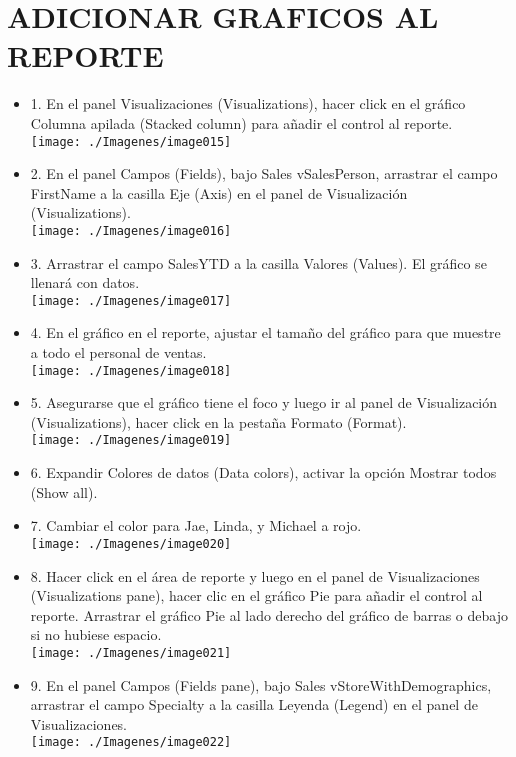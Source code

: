 \section{ADICIONAR GRAFICOS AL REPORTE} 

\begin{itemize}

\item 1. En el panel Visualizaciones (Visualizations), hacer click en el gráfico Columna apilada (Stacked column) para
añadir el control al reporte. \\
\texttt{[image: ./Imagenes/image015]}
\item 2. En el panel Campos (Fields), bajo Sales vSalesPerson, arrastrar el campo FirstName a la casilla Eje (Axis) en el
panel de Visualización (Visualizations). \\
\texttt{[image: ./Imagenes/image016]}

\item 3. Arrastrar el campo SalesYTD a la casilla Valores (Values). El gráfico se llenará con datos.\\
\texttt{[image: ./Imagenes/image017]}
\item 4. En el gráfico en el reporte, ajustar el tamaño del gráfico para que muestre a todo el personal de ventas. \\
\texttt{[image: ./Imagenes/image018]}
\item 5. Asegurarse que el gráfico tiene el foco y luego ir al panel de Visualización (Visualizations), hacer click en la pestaña Formato (Format). \\
\texttt{[image: ./Imagenes/image019]}

\item 6. Expandir Colores de datos (Data colors), activar la opción Mostrar todos (Show all). \\
\item 7. Cambiar el color para Jae, Linda, y Michael a rojo. \\
\texttt{[image: ./Imagenes/image020]}
\item 8. Hacer click en el área de reporte y luego en el panel de Visualizaciones (Visualizations pane), hacer clic en el gráfico Pie para añadir el control al reporte. Arrastrar el gráfico Pie al lado derecho del gráfico de barras o debajo si no hubiese espacio.  \\
\texttt{[image: ./Imagenes/image021]}
\item 9. En el panel Campos (Fields pane), bajo Sales vStoreWithDemographics, arrastrar el campo Specialty a la casilla Leyenda (Legend) en el panel de Visualizaciones. \\
\texttt{[image: ./Imagenes/image022]}


\end{itemize}
